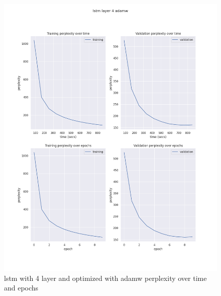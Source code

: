 \documentclass[12pt]{article}
\theoremstyle{definition}
\begin{document}
\begin{figure}[H]
     \centering
     \includegraphics[scale=0.4]{lstm_layer_4_adamw.png}
     \caption{lstm with 4 layer and optimized with adamw perplexity over time and epochs}
\end{figure}
\end{document}
